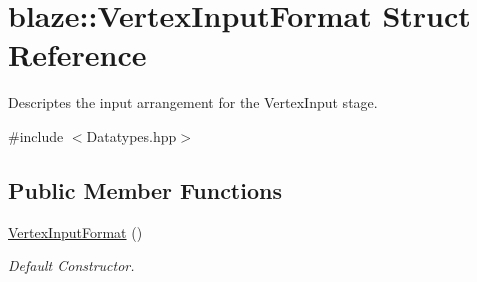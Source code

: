 \hypertarget{structblaze_1_1VertexInputFormat}{}\section{blaze\+:\+:Vertex\+Input\+Format Struct Reference}
\label{structblaze_1_1VertexInputFormat}


Descriptes the input arrangement for the Vertex\+Input stage.  




{\ttfamily \#include $<$Datatypes.\+hpp$>$}

\subsection*{Public Member Functions}
\begin{DoxyCompactItemize}
\item 
\hyperlink{structblaze_1_1VertexInputFormat_a303f81c990469ace47c11051105434fe}{Vertex\+Input\+Format} ()
\begin{DoxyCompactList}\small\item\em Default Constructor. \end{DoxyCompactList}\end{DoxyCompactItemize}
